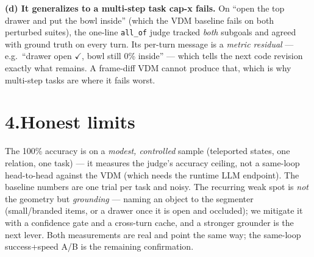 \documentclass[11pt]{article}
\begin{document}
\textbf{(d) It generalizes to a multi-step task cap-x fails.} On ``open the top drawer and put
the bowl inside'' (which the VDM baseline fails on both perturbed suites), the one-line
\texttt{all\_of} judge tracked \emph{both} subgoals and agreed with ground truth on every turn.
Its per-turn message is a \emph{metric residual} --- e.g.\ ``drawer open $\checkmark$, bowl still
0\% inside'' --- which tells the next code revision exactly what remains. A frame-diff VDM cannot
produce that, which is why multi-step tasks are where it fails worst.

\section*{4.\quad Honest limits}

The 100\% accuracy is on a \emph{modest, controlled} sample (teleported states, one relation,
one task) --- it measures the judge's accuracy ceiling, not a same-loop head-to-head against the
VDM (which needs the runtime LLM endpoint). The baseline numbers are one trial per task and
noisy. The recurring weak spot is \emph{not} the geometry but \emph{grounding} --- naming an
object to the segmenter (small/branded items, or a drawer once it is open and occluded); we
mitigate it with a confidence gate and a cross-turn cache, and a stronger grounder is the next
lever. Both measurements are real and point the same way; the same-loop success+speed A/B is the
remaining confirmation.
\end{document}
